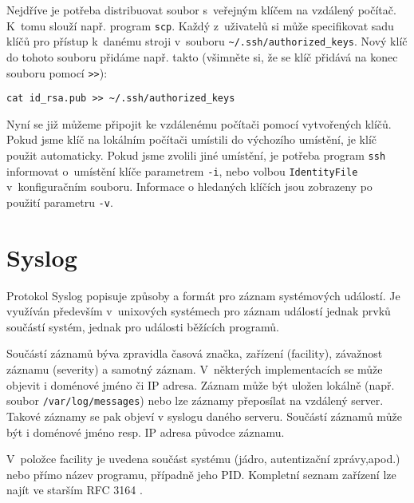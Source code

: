 Nejdříve je potřeba distribuovat soubor s~veřejným klíčem na vzdálený počítač. K~tomu slouží
 např. program {\tt scp}. Každý z~uživatelů si může specifikovat sadu klíčů pro přístup k~danému
 stroji v~souboru \verb|~/.ssh/authorized_keys|. Nový klíč do tohoto souboru přidáme např. takto
 (všimněte si, že se klíč přidává na konec souboru pomocí \verb|>>|):

\begin{verbatim}
cat id_rsa.pub >> ~/.ssh/authorized_keys
\end{verbatim}

Nyní se již můžeme připojit ke vzdálenému počítači pomocí vytvořených klíčů. Pokud jsme klíč
 na lokálním počítači umístili do výchozího umístění, je klíč použit automaticky. Pokud jsme
 zvolili jiné umístění, je potřeba program {\tt ssh} informovat o~umístění klíče parametrem
 {\tt -i}, nebo volbou {\tt IdentityFile} v~konfiguračním souboru. Informace o hledaných
 klíčích jsou zobrazeny po použití parametru {\tt -v}.

\section{Syslog}
\label{syslog}

Protokol Syslog \cite{rfc5424} popisuje způsoby a formát pro záznam systémových událostí. Je využíván
 především v~unixových systémech pro záznam událostí jednak prvků součástí systém, jednak pro
 události běžících programů. 

Součástí záznamů býva zpravidla časová značka, zařízení (facility), závažnost záznamu (severity)
 a samotný záznam. V~některých implementacích se může objevit i doménové jméno či IP adresa. Záznam
 může být uložen lokálně (např. soubor \verb|/var/log/messages|) nebo lze záznamy přeposílat
 na vzdálený server. Takové záznamy se pak objeví v syslogu daného serveru. Součástí záznamů může být
 i doménové jméno resp. IP adresa původce záznamu.

V~položce facility je uvedena součást systému (jádro, autentizační zprávy,apod.) nebo
 přímo název programu, případně jeho PID. Kompletní seznam zařízení lze najít ve starším RFC 3164
 \cite{rfc3164}.

